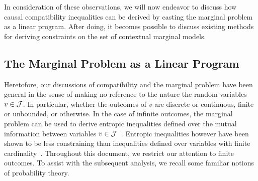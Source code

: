 \documentclass[aps, 10pt, english, twoside, pra, nofootinbib, tightenlines, longbibliography]{revtex4-1}
\begin{document}
    In consideration of these observations, we will now endeavor to discuss how causal compatibility inequalities can be derived by casting the marginal problem as a linear program. After doing, it becomes possible to discuss existing methods for deriving constraints on the set of contextual marginal models.

    \subsection{The Marginal Problem as a Linear Program}
    \label{sec:marginal_linear}

    Heretofore, our discussions of compatibility and the marginal problem have been general in the sense of making no reference to the nature the random variables $v \in \mathcal{J}$. In particular, whether the outcomes of $v$ are discrete or continuous, finite or unbounded, or otherwise. In the case of infinite outcomes, the marginal problem can be used to derive entropic inequalities defined over the mutual information between variables $v \in \mathcal{J}$~\cite{Fritz_2011}. Entropic inequalities however have been shown to be less constraining than inequalities defined over variables with finite cardinality~\cite{Inflation}. Throughout this document, we restrict our attention to finite outcomes. To assist with the subsequent analysis, we recall some familiar notions of probability theory.
\end{document}

